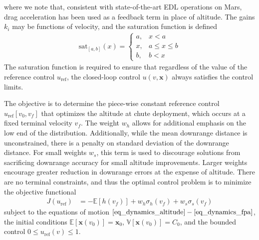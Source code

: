 \documentclass[journal ]{new-aiaa}
\newcommand{\state}{\ensuremath{\mathbf{x}}}
\newcommand{\ur}{\ensuremath{u_{\mathrm{ref}}}}
\newcommand{\E}[1]{\mathbb{E}\left[#1\right]}
\newcommand{\V}[1]{\mathbb{V}[#1]}
\newcommand{\cov}{C}
\begin{document}
where we note that, consistent with state-of-the-art EDL operations on Mars, drag acceleration has been used as a feedback term in place of altitude. The gains $k_i$ may be functions of velocity, and the saturation function is defined
\begin{align*}
\mathrm{sat}_{[a,b]}(x) = \left\{\begin{array}{lc}
        a, &  x < a\\
        x, &  a\le x \le b\\
        b, &  b < x
        \end{array} \right. %
\end{align*}
The saturation function is required to ensure that regardless of the value of the reference control \ur, the closed-loop control $u(v,\state)$ always satisfies the control limits. 

The objective is to determine the piece-wise constant reference control $\ur\left[v_0,v_f\right]$ that optimizes the altitude at chute deployment, which occurs at a fixed terminal velocity $v_f$. The weight $w_h$ allows for additional emphasis on the low end of the distribution. Additionally, while the mean downrange distance is unconstrained, there is a penalty on standard deviation of the downrange distance. For small weights $w_s$, this term is used to discourage solutions from sacrificing downrange accuracy for small altitude improvements. Larger weights encourage greater reduction in downrange errors at the expense of altitude.  There are no terminal constraints, and thus the optimal control problem is to minimize the objective functional
\begin{align}
J(\ur) &= -\E{h(v_f)} + w_h\sigma_h(v_f) + w_s\sigma_s(v_f) \label{eq_objective}
\end{align}
subject to the equations of motion $\ref{eq_dynamics_altitude}-\ref{eq_dynamics_fpa}$, the initial conditions $\E{\state(v_0)} = \state_0$, $\V{\state(v_0)} = \cov_0$, and the bounded control $0 \le \ur(v) \le 1$.
\end{document}
